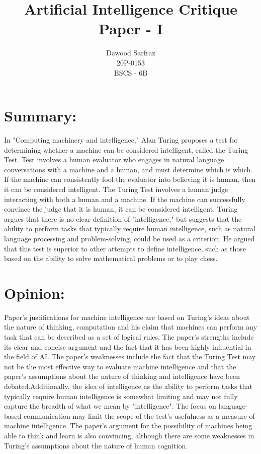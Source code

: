 \documentclass{article}
\title{Artificial Intelligence Critique Paper - I}
\author{Dawood Sarfraz \\ 20P-0153 \\ BSCS - 6B}
\begin{document}
\maketitle

\section{Summary:}
In "Computing machinery and intelligence," Alan Turing proposes a test for determining whether a machine can be considered intelligent, called the Turing Test. Test involves a human evaluator who engages in natural language conversations with a machine and a human, and must determine which is which. If the machine can consistently fool the evaluator into believing it is human, then it can be considered intelligent. The Turing Test involves a human judge interacting with both a human and a machine. If the machine can successfully convince the judge that it is human, it can be considered intelligent. Turing argues that there is no clear definition of "intelligence," but suggests that the ability to perform tasks that typically require human intelligence, such as natural language processing and problem-solving, could be used as a criterion. He argued that this test is superior to other attempts to define intelligence, such as those based on the ability to solve mathematical problems or to play chess.

\section{Opinion:}
Paper's justifications for machine intelligence are based on Turing's ideas about the nature of thinking, computation and his claim that machines can perform any task that can be described as a set of logical rules. The paper's strengths include its clear and concise argument and the fact that it has been highly influential in the field of AI. The paper's weaknesses include the fact that the Turing Test may not be the most effective way to evaluate machine intelligence and that the paper's assumptions about the nature of thinking and intelligence have been debated.Additionally, the idea of intelligence as the ability to perform tasks that typically require human intelligence is somewhat limiting and may not fully capture the breadth of what we mean by "intelligence". The focus on language-based communication may limit the scope of the test's usefulness as a measure of machine intelligence. The paper's argument for the possibility of machines being able to think and learn is also convincing, although there are some weaknesses in Turing's assumptions about the nature of human cognition.
\end{document}
